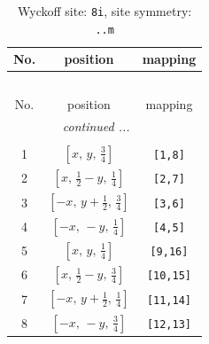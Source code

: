 \documentclass[fleqn,8pt]{jsarticle}
\begin{document}
\begin{longtable}{ccc}
\caption{Wyckoff site: {\tt 8i}, site symmetry: {\tt ..m}}
 \\
 \hline \hline
No. & position & mapping \\ \hline \endfirsthead

\multicolumn{2}{l}{\tablename\ \thetable{}} \\
 \hline \hline
No. & position & mapping \\ \hline \endhead

 \hline \hline
\multicolumn{2}{r}{\footnotesize\it continued ...} \\ \endfoot

 \hline \hline
\multicolumn{2}{r}{} \\ \endlastfoot

1 & $\left[ x,\, y,\, \frac{3}{4} \right]$ & {\tt [1,8]} \\ \hline
2 & $\left[ x,\, \frac{1}{2} - y,\, \frac{1}{4} \right]$ & {\tt [2,7]} \\ \hline
3 & $\left[ - x,\, y + \frac{1}{2},\, \frac{3}{4} \right]$ & {\tt [3,6]} \\ \hline
4 & $\left[ - x,\, - y,\, \frac{1}{4} \right]$ & {\tt [4,5]} \\ \hline
5 & $\left[ x,\, y,\, \frac{1}{4} \right]$ & {\tt [9,16]} \\ \hline
6 & $\left[ x,\, \frac{1}{2} - y,\, \frac{3}{4} \right]$ & {\tt [10,15]} \\ \hline
7 & $\left[ - x,\, y + \frac{1}{2},\, \frac{1}{4} \right]$ & {\tt [11,14]} \\ \hline
8 & $\left[ - x,\, - y,\, \frac{3}{4} \right]$ & {\tt [12,13]} \\
\end{longtable}
\renewcommand{\arraystretch}{1.2}
\end{document}

